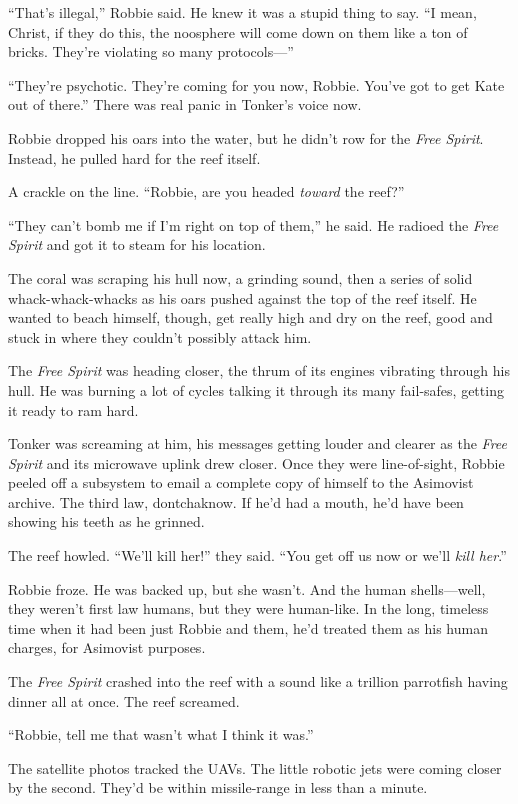 “That’s illegal,” Robbie said. He knew it was a stupid thing to
say. “I mean, Christ, if they do this, the noosphere will come down
on them like a ton of bricks. They’re violating so many
protocols—”

“They’re psychotic. They’re coming for you now, Robbie. You’ve got
to get Kate out of there.” There was real panic in Tonker’s voice
now.

Robbie dropped his oars into the water, but he didn’t row for the
\emph{Free Spirit}. Instead, he pulled hard for the reef itself.

A crackle on the line. “Robbie, are you headed \emph{toward} the
reef?”

“They can’t bomb me if I’m right on top of them,” he said. He
radioed the \emph{Free Spirit} and got it to steam for his
location.

The coral was scraping his hull now, a grinding sound, then a
series of solid whack-whack-whacks as his oars pushed against the
top of the reef itself. He wanted to beach himself, though, get
really high and dry on the reef, good and stuck in where they
couldn’t possibly attack him.

The \emph{Free Spirit} was heading closer, the thrum of its engines
vibrating through his hull. He was burning a lot of cycles talking
it through its many fail-safes, getting it ready to ram hard.

Tonker was screaming at him, his messages getting louder and
clearer as the \emph{Free Spirit} and its microwave uplink drew
closer. Once they were line-of-sight, Robbie peeled off a subsystem
to email a complete copy of himself to the Asimovist archive. The
third law, dontchaknow. If he’d had a mouth, he’d have been showing
his teeth as he grinned.

The reef howled. “We’ll kill her!” they said. “You get off us now
or we’ll \emph{kill her}.”

Robbie froze. He was backed up, but she wasn’t. And the human
shells—well, they weren’t first law humans, but they were
human-like. In the long, timeless time when it had been just Robbie
and them, he’d treated them as his human charges, for Asimovist
purposes.

The \emph{Free Spirit} crashed into the reef with a sound like a
trillion parrotfish having dinner all at once. The reef screamed.

“Robbie, tell me that wasn’t what I think it was.”

The satellite photos tracked the UAVs. The little robotic jets were
coming closer by the second. They’d be within missile-range in less
than a minute.

